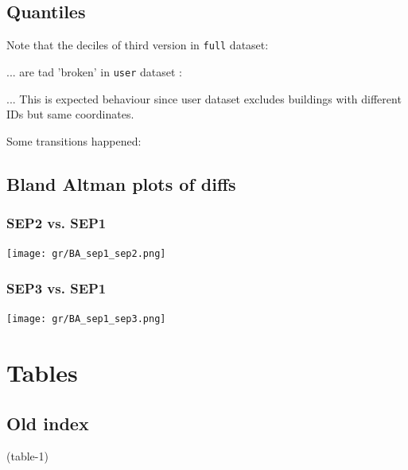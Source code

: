 \documentclass[a4paper, notitlepage, fleqn]{article} %
\begin{document}
\subsection{Quantiles}

Note that the deciles of third version in \texttt{full} dataset:
\begin{stlog}\end{stlog}
... are tad 'broken' in \texttt{user} dataset :
\begin{stlog}\end{stlog}
... This is expected behaviour since user dataset excludes buildings with different IDs but same coordinates.  
\begin{landscape}
Some transitions happened:  
\begin{stlog}\end{stlog}
\end{landscape}

\subsection{Bland Altman plots of diffs}
\subsubsection{SEP2 vs. SEP1}

\begin{center}
\texttt{[image: gr/BA\_sep1\_sep2.png]} 
\end{center}

\subsubsection{SEP3 vs. SEP1}

\begin{center}
\texttt{[image: gr/BA\_sep1\_sep3.png]} 
\end{center}
\newpage
\section{Tables}

\newpage
\subsection{Old index}
\begin{landscape}
\begin{footnotesize}
(table-1)
\end{footnotesize}
\end{landscape}
\end{document}
